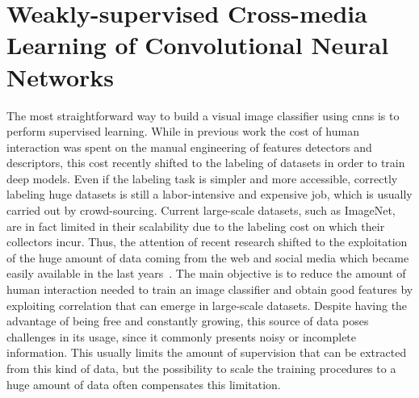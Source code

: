 
\graphicspath{{img/vsa/}}

\newcommand{\BTSA}{B-T4SA}
\newcommand{\ourFtAlex}{Hybrid-T4SA}
\newcommand{\ourFtVGG}{VGG-T4SA}

\chapter{Weakly-supervised Cross-media Learning of Convolutional Neural Networks}
\label{ch:cross-media}

The most straightforward way to build a visual image classifier using \glspl{cnn} is to perform supervised learning.
While in previous work the cost of human interaction was spent on the manual engineering of features detectors and descriptors, this cost recently shifted to the labeling of datasets in order to train deep models.
Even if the labeling task is simpler and more accessible, correctly labeling huge datasets is still a labor-intensive and expensive job, which is usually carried out by crowd-sourcing.
Current large-scale datasets, such as ImageNet, are in fact limited in their scalability due to the labeling cost on which their collectors incur.
Thus, the attention of recent research shifted to the exploitation of the huge amount of data coming from the web and social media which became easily available in the last years~\cite{sun2017revisiting,mahajan2018exploring}.
The main objective is to reduce the amount of human interaction needed to train an image classifier and obtain good features by exploiting correlation that can emerge in large-scale datasets.
Despite having the advantage of being free and constantly growing, this source of data poses challenges in its usage, since it commonly presents noisy or incomplete information.
This usually limits the amount of supervision that can be extracted from this kind of data, but the possibility to scale the training procedures to a huge amount of data often compensates this limitation.

